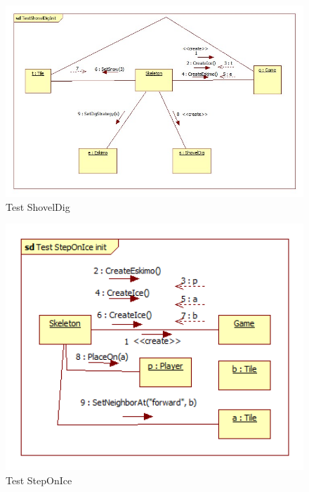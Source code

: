 \begin{figure}[h]
	\begin{center}
		\includegraphics[width=17cm]{chapters/chapter05/diagrams/TestShovelDigInit.jpg}
		\caption{Test ShovelDig}
		\label{fig:Test ShovelDig}
	\end{center}
\end{figure}

\begin{figure}[h]
	\begin{center}
		\includegraphics[width=17cm]{chapters/chapter05/diagrams/Test_StepOnIce_init.png}
		\caption{Test StepOnIce}
		\label{fig:Test StepOnIce}
	\end{center}
\end{figure}

